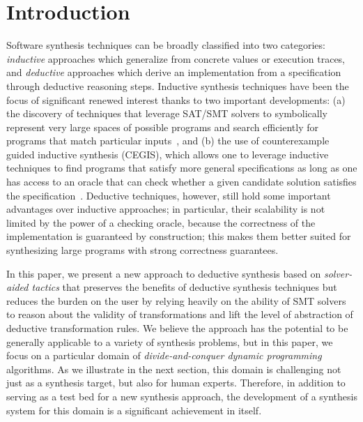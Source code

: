 \section{Introduction}
\label{intro}


\newcommand{\xidx}{i}
\newcommand{\yidx}{j}
\newcommand{\xw}[1]{w_{#1}}
\newcommand{\yw}[1]{w'_{#1}}



Software synthesis techniques can be broadly classified into two categories: \emph{inductive} approaches which generalize from concrete values or execution traces, and \emph{deductive} approaches which derive an implementation from a specification through deductive reasoning steps. Inductive synthesis techniques have been the focus of significant renewed interest thanks to two important developments: (a) the discovery of techniques that leverage SAT/SMT solvers to symbolically represent very large spaces of possible programs and search efficiently for programs that match particular inputs~\cite{APLAS09/Solar-Lezama, PLDI11/Gulwani, PLDI15/Osera}, and (b) the use of counterexample guided inductive synthesis (CEGIS), which allows one to leverage inductive techniques to find programs that satisfy more general specifications as long as one has access to an oracle that can check whether a given candidate solution satisfies the specification~\cite{APLAS09/Solar-Lezama}. Deductive techniques, however, still hold some important advantages over inductive approaches; in particular, their scalability is not limited by the power of a checking oracle, because the correctness of the implementation is guaranteed by construction; this makes them better suited for synthesizing large programs with strong correctness guarantees. 

In this paper, we present a new approach to deductive synthesis based on \emph{solver-aided tactics} that preserves the benefits of deductive synthesis techniques but reduces the burden on the user by relying heavily on the ability of SMT solvers to reason about the validity of transformations and lift the level of abstraction of deductive transformation rules. We believe the approach has the potential to be generally applicable to a variety of synthesis problems, but in this paper, we focus on a particular domain of \emph{divide-and-conquer dynamic programming} algorithms. As we illustrate in the next section, this domain is challenging not just as a synthesis target, but also for human experts. Therefore, in addition to serving as a test bed for a new synthesis approach, the development of a synthesis system for this domain is a significant achievement in itself.

